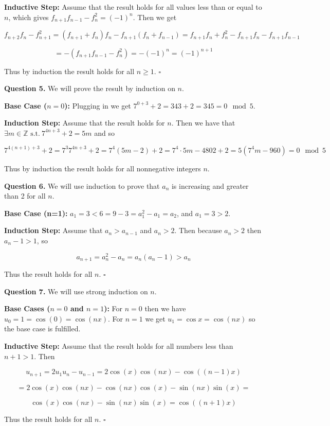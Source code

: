 \documentclass[letterpaper, reqno,11pt]{article}
\newcommand{\ZZ}{\mathbb{Z}}
\newcommand{\st}{\text{ s.t.}\ }
\begin{document}
{\bf Inductive Step:} Assume that the result holds for all values less than or equal to $n$, which gives $f_{n+1}f_{n-1}-f_{n}^2=(-1)^{n}$. Then we get 

$$
    f_{n+2}f_{n}-f_{n+1}^2=(f_{n+1}+f_n)f_n-f_{n+1}(f_{n}+f_{n-1})=f_{n+1}f_n+f_n^2-f_{n+1}f_n-f_{n+1}f_{n-1}
$$ 
    
$$
    =-(f_{n+1}f_{n-1}-f_n^2)=-(-1)^n=(-1)^{n+1}
$$

Thus by induction the result holds for all $n\geq 1$. $\square$

{\noindent\bf Question 5.} We will prove the result by induction on $n$. 

{\bf Base Case ($n=0$):} Plugging in we get $7^{0+3}+2=343+2=345=0\mod 5$. 

{\bf Induction Step:} Assume that the result holds for $n$. Then we have that $\exists m\in\ZZ\st 7^{4n+3}+2=5m$ and so

$$
    7^{4(n+1)+3}+2=7^3 7^{4n+3}+2=7^4(5m-2)+2=7^4\cdot 5m-4802+2=5(7^4m-960)=0\mod 5
$$

Thus by induction the result holds for all nonnegative integers $n$. 

{\noindent\bf Question 6.} We will use induction to prove that $a_n$ is increasing and greater than 2 for all $n$. 

{\bf Base Case (n=1):} $a_1=3< 6=9-3=a_1^2-a_1=a_2$, and $a_1=3>2$. 

{\bf Induction Step:} Assume that $a_n>a_{n-1}$ and $a_n>2$. Then because $a_n>2$ then $a_n-1>1$, so 

$$
    a_{n+1}=a_n^2-a_n=a_n(a_n-1)> a_n
$$

Thus the result holds for all $n$. $\square$

{\noindent\bf Question 7.} We will use strong induction on $n$. 

{\bf Base Cases ($n=0$ and $n=1$):} For $n=0$ then we have $u_0=1=\cos(0)=\cos(nx)$. For $n=1$ we get $u_1=\cos x=\cos(nx)$ so the base case is fulfilled. 

{\bf Inductive Step:} Assume that the result holds for all numbers less than $n+1>1$. Then 

$$
    u_{n+1}=2u_1u_{n}-u_{n-1}=2\cos(x)\cos(nx)-\cos((n-1)x)
$$

$$
    =2\cos(x)\cos(nx)-\cos(nx)\cos(x)-\sin(nx)\sin(x)=
$$

$$
    \cos(x)\cos(nx)-\sin(nx)\sin(x)=\cos((n+1)x)
$$

Thus the result holds for all $n$. $\square$
\end{document}
